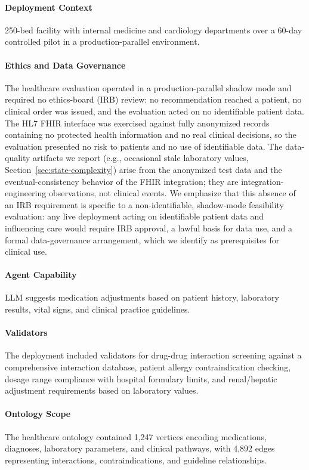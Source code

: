 \documentclass[sigconf,nonacm]{acmart}
\begin{document}
\paragraph{Deployment Context} 250-bed facility with internal medicine and cardiology departments over a 60-day controlled pilot in a production-parallel environment.

\paragraph{Ethics and Data Governance} The healthcare evaluation operated in a production-parallel shadow mode and required no ethics-board (IRB) review: no recommendation reached a patient, no clinical order was issued, and the evaluation acted on no identifiable patient data. The HL7 FHIR interface was exercised against fully anonymized records containing no protected health information and no real clinical decisions, so the evaluation presented no risk to patients and no use of identifiable data. The data-quality artifacts we report (e.g., occasional stale laboratory values, Section~\ref{sec:state-complexity}) arise from the anonymized test data and the eventual-consistency behavior of the FHIR integration; they are integration-engineering observations, not clinical events. We emphasize that this absence of an IRB requirement is specific to a non-identifiable, shadow-mode feasibility evaluation: any live deployment acting on identifiable patient data and influencing care would require IRB approval, a lawful basis for data use, and a formal data-governance arrangement, which we identify as prerequisites for clinical use.

\paragraph{Agent Capability} LLM suggests medication adjustments based on patient history, laboratory results, vital signs, and clinical practice guidelines.

\paragraph{Validators} The deployment included validators for drug-drug interaction screening against a comprehensive interaction database, patient allergy contraindication checking, dosage range compliance with hospital formulary limits, and renal/hepatic adjustment requirements based on laboratory values.

\paragraph{Ontology Scope} The healthcare ontology contained 1,247 vertices encoding medications, diagnoses, laboratory parameters, and clinical pathways, with 4,892 edges representing interactions, contraindications, and guideline relationships.
\end{document}
